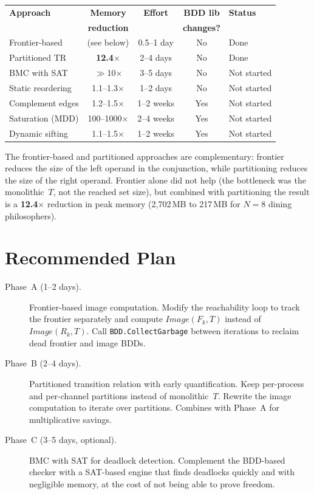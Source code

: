 \documentclass[11pt]{article}
\begin{document}
\begin{center}
\begin{tabular}{lcccl}
\toprule
\textbf{Approach} &
\textbf{Memory} &
\textbf{Effort} &
\textbf{BDD lib} &
\textbf{Status} \\
& \textbf{reduction} & & \textbf{changes?} & \\
\midrule
Frontier-based       & (see below)      & 0.5--1 day  & No  & Done \\
Partitioned TR       & \textbf{12.4$\times$} & 2--4 days & No & Done \\
BMC with SAT         & $\gg$10$\times$  & 3--5 days   & No  & Not started \\
Static reordering    & 1.1--1.3$\times$ & 1--2 days   & No  & Not started \\
Complement edges     & 1.2--1.5$\times$ & 1--2 weeks  & Yes & Not started \\
Saturation (MDD)     & 100--1000$\times$& 2--4 weeks  & Yes & Not started \\
Dynamic sifting      & 1.1--1.5$\times$ & 1--2 weeks  & Yes & Not started \\
\bottomrule
\end{tabular}
\end{center}

The frontier-based and partitioned approaches are complementary:
frontier reduces the size of the left operand in the conjunction,
while partitioning reduces the size of the right operand.  Frontier
alone did not help (the bottleneck was the monolithic~$T$, not the
reached set size), but combined with partitioning the result is a
\textbf{12.4$\times$} reduction in peak memory (2,702\,MB to 217\,MB
for $N = 8$ dining philosophers).

\section{Recommended Plan}

\begin{description}
\item[Phase~A (1--2 days).]
  Frontier-based image computation.  Modify the reachability loop
  to track the frontier separately and compute
  $\mathit{Image}(F_k, T)$ instead of $\mathit{Image}(R_k, T)$.
  Call \texttt{BDD.CollectGarbage} between iterations to reclaim
  dead frontier and image BDDs.

\item[Phase~B (2--4 days).]
  Partitioned transition relation with early quantification.
  Keep per-process and per-channel partitions instead of monolithic~$T$.
  Rewrite the image computation to iterate over partitions.
  Combines with Phase~A for multiplicative savings.

\item[Phase~C (3--5 days, optional).]
  BMC with SAT for deadlock detection.  Complement the BDD-based
  checker with a SAT-based engine that finds deadlocks quickly and
  with negligible memory, at the cost of not being able to prove
  freedom.
\end{description}
\end{document}
